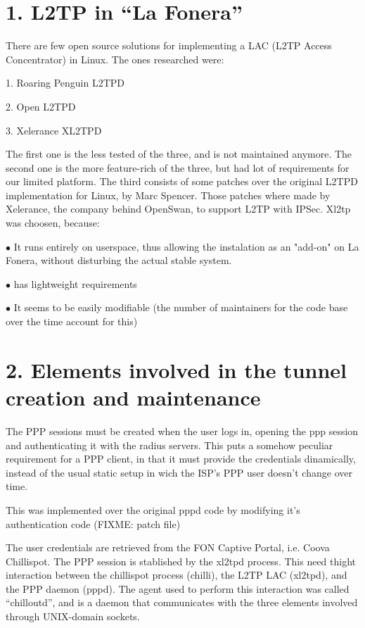 \section{1. L2TP in ``La Fonera''}
There are few open source solutions for implementing a LAC (L2TP Access
Concentrator) in Linux. The ones researched were:

\item {1.} Roaring Penguin L2TPD
\item {2.} Open L2TPD
\item {3.} Xelerance XL2TPD

The first one is the less tested of the three, and is not maintained anymore.
The second one is the more feature-rich of the three, but had lot of
requirements for our limited platform. The third consists of some patches
over the original L2TPD implementation for Linux, by Marc Spencer. Those
patches where made by Xelerance, the company behind OpenSwan, to support
L2TP with IPSec. Xl2tp was choosen, because:

\item {$\bullet$} It runs entirely on userspace, thus allowing the instalation as
   an "add-on" on La Fonera, without disturbing the actual stable
   system.
\item {$\bullet$} has lightweight requirements
\item {$\bullet$} It seems to be easily modifiable (the number of maintainers for the
   code base over the time account for this)

\section{2. Elements involved in the tunnel creation and maintenance}

The PPP sessions must be created when the user logs in, opening the
ppp session and authenticating it with the radius servers.
This puts a somehow peculiar requirement for a PPP client, in
that it must provide the credentials dinamically, instead of the usual
static setup in wich the ISP's PPP user doesn't change over time.

This was implemented over the original pppd code by modifying it's
authentication code (FIXME: patch file)

The user credentials are retrieved from the FON Captive Portal, i.e.
Coova Chillispot. The PPP session is stablished by the xl2tpd process.
This need thight interaction between the chillispot process
(chilli), the L2TP LAC (xl2tpd), and the PPP daemon (pppd). The agent used
to perform this interaction was called ``chilloutd'', and is a
daemon that communicates with the three elements involved
through UNIX-domain sockets.  

